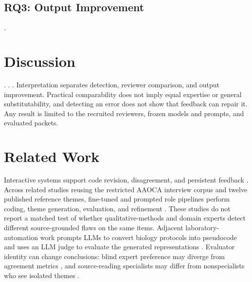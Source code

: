 \subsection{RQ3: Output Improvement}

.

\section{Discussion}

. . . Interpretation separates detection, reviewer comparison, and output improvement. Practical comparability does not imply equal expertise or general substitutability, and detecting an error does not show that feedback can repair it. Any result is limited to the recruited reviewers, frozen models and prompts, and evaluated packets.

\section{Related Work}

Interactive systems support code revision, disagreement, and persistent feedback \citep{dai2023llm,gao2024collabcoder,wang2026centaurta}. Across related studies reusing the restricted AAOCA interview corpus and twelve published reference themes, fine-tuned and prompted role pipelines perform coding, theme generation, evaluation, and refinement \citep{yi2025sftta,yi2025autota,xu2026tama}. These studies do not report a matched test of whether qualitative-methods and domain experts detect different source-grounded flaws on the same items. Adjacent laboratory-automation work prompts LLMs to convert biology protocols into pseudocode and uses an LLM judge to evaluate the generated representations \citep{yi2024protomed}. Evaluator identity can change conclusions: blind expert preference may diverge from agreement metrics \citep{liu2026agreement}, and source-reading specialists may differ from nonspecialists who see isolated themes \citep{moskalewicz2026phenomenology}.

